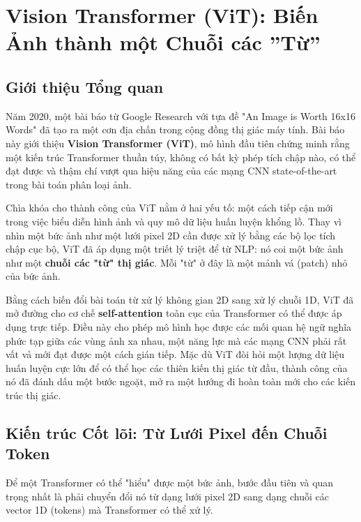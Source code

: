 \section{Vision Transformer (ViT): Biến Ảnh thành một Chuỗi các ''Từ''}
\label{sec:vision_transformer}

\subsection{Giới thiệu Tổng quan}
\label{subsec:vit_overview}
Năm 2020, một bài báo từ Google Research với tựa đề "An Image is Worth 16x16 Words" \cite{Dosovitskiy2020} đã tạo ra một cơn địa chấn trong cộng đồng thị giác máy tính. Bài báo này giới thiệu \textbf{Vision Transformer (ViT)}, mô hình đầu tiên chứng minh rằng một kiến trúc Transformer thuần túy, không có bất kỳ phép tích chập nào, có thể đạt được và thậm chí vượt qua hiệu năng của các mạng CNN state-of-the-art trong bài toán phân loại ảnh.

Chìa khóa cho thành công của ViT nằm ở hai yếu tố: một cách tiếp cận mới trong việc biểu diễn hình ảnh và quy mô dữ liệu huấn luyện khổng lồ. Thay vì nhìn một bức ảnh như một lưới pixel 2D cần được xử lý bằng các bộ lọc tích chập cục bộ, ViT đã áp dụng một triết lý triệt để từ NLP: nó coi một bức ảnh như một \textbf{chuỗi các "từ" thị giác}. Mỗi "từ" ở đây là một mảnh vá (patch) nhỏ của bức ảnh.

Bằng cách biến đổi bài toán từ xử lý không gian 2D sang xử lý chuỗi 1D, ViT đã mở đường cho cơ chế \textbf{self-attention} toàn cục của Transformer có thể được áp dụng trực tiếp. Điều này cho phép mô hình học được các mối quan hệ ngữ nghĩa phức tạp giữa các vùng ảnh xa nhau, một năng lực mà các mạng CNN phải rất vất vả mới đạt được một cách gián tiếp. Mặc dù ViT đòi hỏi một lượng dữ liệu huấn luyện cực lớn để có thể học các thiên kiến thị giác từ đầu, thành công của nó đã đánh dấu một bước ngoặt, mở ra một hướng đi hoàn toàn mới cho các kiến trúc thị giác.

\subsection{Kiến trúc Cốt lõi: Từ Lưới Pixel đến Chuỗi Token}
\label{subsec:vit_core_architecture}
Để một Transformer có thể "hiểu" được một bức ảnh, bước đầu tiên và quan trọng nhất là phải chuyển đổi nó từ dạng lưới pixel 2D sang dạng chuỗi các vector 1D (tokens) mà Transformer có thể xử lý.

